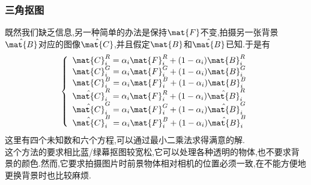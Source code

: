 \documentclass{ctexart}
\begin{document}
\subsubsection{三角抠图}
既然我们缺乏信息,另一种简单的办法是保持$\mat{F}$不变,拍摄另一张背景$\hat{\mat{B}}$对应的图像$\hat{\mat{C}}$,并且假定$\mat{B}$和$\hat{\mat{B}}$已知.于是有
\[\left\{\begin{array}{l}
    \mat{C}_i^R=\alpha_i\mat{F}_i^R+(1-\alpha_i)\mat{B}_i^R\\
    \mat{C}_i^G=\alpha_i\mat{F}_i^G+(1-\alpha_i)\mat{B}_i^G\\
    \mat{C}_i^B=\alpha_i\mat{F}_i^B+(1-\alpha_i)\mat{B}_i^B\\
    \hat{\mat{C}}_i^R=\alpha_i\mat{F}_i^R+(1-\alpha_i)\hat{\mat{B}}_i^R\\
    \hat{\mat{C}}_i^G=\alpha_i\mat{F}_i^G+(1-\alpha_i)\hat{\mat{B}}_i^G\\
    \hat{\mat{C}}_i^B=\alpha_i\mat{F}_i^B+(1-\alpha_i)\hat{\mat{B}}_i^B
\end{array}\right.\]
这里有四个未知数和六个方程,可以通过最小二乘法求得满意的解.\\
\indent 这个方法的要求相比蓝/绿幕抠图较宽松,它可以处理各种透明的物体,也不要求背景的颜色.然而,它要求拍摄图片时前景物体相对相机的位置必须一致,在不能方便地更换背景时也比较麻烦.
\end{document}
